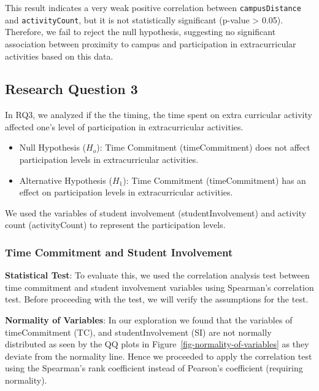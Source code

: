 \documentclass[
  letterpaper,
  DIV=11,
  numbers=noendperiod]{scrartcl}
\providecommand{\tightlist}{%
  \setlength{\itemsep}{0pt}\setlength{\parskip}{0pt}}\usepackage{longtable,booktabs,array}
\begin{document}
This result indicates a very weak positive correlation between
\texttt{campusDistance} and \texttt{activityCount}, but it is not
statistically significant (p-value \textgreater{} 0.05). Therefore, we
fail to reject the null hypothesis, suggesting no significant
association between proximity to campus and participation in
extracurricular activities based on this data.

\subsection{Research Question 3}\label{research-question-3}

In RQ3, we analyzed if the the timing, the time spent on extra
curricular activity affected one's level of participation in
extracurricular activities.

\begin{itemize}
\tightlist
\item
  Null Hypothesis (\(H_{o}\)): Time Commitment (timeCommitment) does not
  affect participation levels in extracurricular activities.
\item
  Alternative Hypothesis (\(H_{1}\)): Time Commitment (timeCommitment)
  has an effect on participation levels in extracurricular activities.
\end{itemize}

We used the variables of student involvement (studentInvolvement) and
activity count (activityCount) to represent the participation levels.

\subsubsection{Time Commitment and Student
Involvement}\label{time-commitment-and-student-involvement}

\textbf{Statistical Test}: To evaluate this, we used the correlation
analysis test between time commitment and student involvement variables
using Spearman's correlation test. Before proceeding with the test, we
will verify the assumptions for the test.

\textbf{Normality of Variables}: In our exploration we found that the
variables of timeCommitment (TC), and studentInvolvement (SI) are not
normally distributed as seen by the QQ plots in
Figure~\ref{fig-normality-of-variables} as they deviate from the
normality line. Hence we proceeded to apply the correlation test using
the Spearman's rank coefficient instead of Pearson's coefficient
(requiring normality).
\end{document}
